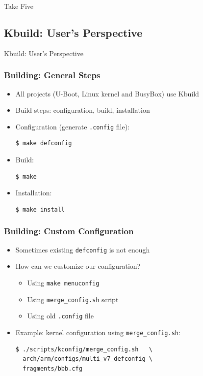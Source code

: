 \documentclass[aspectratio=169]{beamer}
\begin{document}
\begin{frame}[standout]
  Take Five
\end{frame}

\subsection{Kbuild: User's Perspective}

\begin{frame}[standout]
  Kbuild: User's Perspective
\end{frame}

\begin{frame}[fragile]
  \frametitle{Building: General Steps}
  \begin{itemize}
    \item All projects (U-Boot, Linux kernel and BusyBox) use Kbuild
    \item Build steps: configuration, build, installation
    \item \alert{Configuration} (generate \texttt{.config} file):
    \begin{verbatim}
$ make defconfig
    \end{verbatim}
    \item \alert{Build}:
    \begin{verbatim}
$ make
    \end{verbatim}
    \item \alert{Installation}:
    \begin{verbatim}
$ make install
    \end{verbatim}
    \vspace*{-2mm} %
  \end{itemize}
\end{frame}

\begin{frame}[fragile]
  \frametitle{Building: Custom Configuration}
  \begin{itemize}
  \item Sometimes existing \texttt{defconfig} is not enough
  \item How can we customize our configuration?
    \begin{itemize}
      \item Using \texttt{make menuconfig}
      \item Using \texttt{merge\_config.sh} script
      \item Using old \texttt{.config} file
    \end{itemize}
  \pause
  \bigskip
  \item Example: kernel configuration using \texttt{merge\_config.sh}:
  \begin{verbatim}
$ ./scripts/kconfig/merge_config.sh   \
  arch/arm/configs/multi_v7_defconfig \
  fragments/bbb.cfg
  \end{verbatim}
  \vspace*{-2mm} %
  \end{itemize}
\end{frame}
\end{document}

